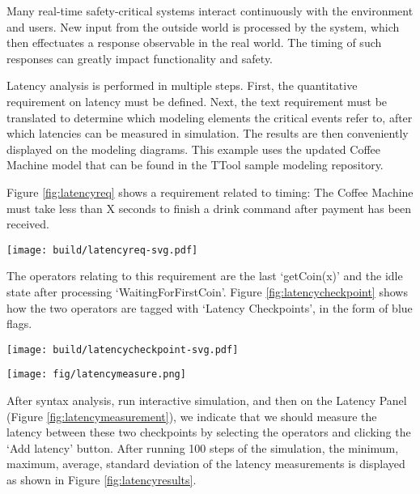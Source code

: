 \documentclass[12pt]{article}
\begin{document}
Many real-time safety-critical systems interact continuously with the environment and users. New input from the outside world is processed by the system, which then effectuates a response observable in the real world. The timing of such responses can greatly impact functionality and safety.

Latency analysis is performed in multiple steps. First, the quantitative requirement on latency must be defined. Next, the text requirement must be translated to determine which modeling elements the critical events refer to, after which latencies can be measured in simulation. The results are then conveniently displayed on the modeling diagrams. This example uses the updated Coffee Machine model that can be found in the TTool sample modeling repository.

Figure \ref{fig:latencyreq} shows a requirement related to timing: The Coffee Machine must take less than X seconds to finish a drink command after payment has been received. 

\begin{figure*}[htbp]
\centering
\texttt{[image: build/latencyreq-svg.pdf]}
\caption{Latency Requirement for Coffee Machine} \label{fig:latencyreq}
\end{figure*}

The operators relating to this requirement are the last `getCoin(x)' and the idle state after processing `WaitingForFirstCoin'. Figure \ref{fig:latencycheckpoint} shows how the two operators are tagged with `Latency Checkpoints', in the form of blue flags.

\begin{figure*}[htbp]
\centering
\texttt{[image: build/latencycheckpoint-svg.pdf]}
\caption{Latency Checkpoints in State Machine Diagrams} \label{fig:latencycheckpoint}
\end{figure*}


\begin{figure*}[htbp]
\centering
\texttt{[image: fig/latencymeasure.png]}
\caption{Latency Measurement Panel} \label{fig:latencymeasurement}
\end{figure*}

After syntax analysis, run interactive simulation, and then on the Latency Panel (Figure \ref{fig:latencymeasurement}), we indicate that we should measure the latency between these two checkpoints by selecting the operators and clicking the `Add latency' button. After running 100 steps of the simulation, the minimum, maximum, average, standard deviation of the latency measurements is displayed as shown in Figure \ref{fig:latencyresults}.
\end{document}
